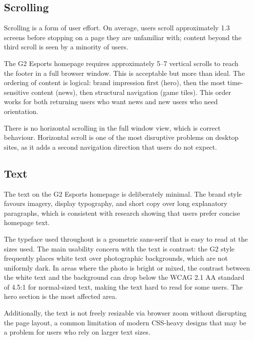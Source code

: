 \documentclass[12pt, a4paper]{article}
\begin{document}
\subsection{Scrolling}

Scrolling is a form of user effort. On average, users scroll approximately 1.3 screens before stopping on a page they are unfamiliar with; content beyond the third scroll is seen by a minority of users.

The G2 Esports homepage requires approximately 5--7 vertical scrolls to reach the footer in a full browser window. This is acceptable but more than ideal. The ordering of content is logical: brand impression first (hero), then the most time-sensitive content (news), then structural navigation (game tiles). This order works for both returning users who want news and new users who need orientation.

There is no horizontal scrolling in the full window view, which is correct behaviour. Horizontal scroll is one of the most disruptive problems on desktop sites, as it adds a second navigation direction that users do not expect.

\subsection{Text}

The text on the G2 Esports homepage is deliberately minimal. The brand style favours imagery, display typography, and short copy over long explanatory paragraphs, which is consistent with research showing that users prefer concise homepage text.

The typeface used throughout is a geometric sans-serif that is easy to read at the sizes used. The main usability concern with the text is contrast: the G2 style frequently places white text over photographic backgrounds, which are not uniformly dark. In areas where the photo is bright or mixed, the contrast between the white text and the background can drop below the WCAG 2.1 AA standard of 4.5:1 for normal-sized text, making the text hard to read for some users. The hero section is the most affected area.

Additionally, the text is not freely resizable via browser zoom without disrupting the page layout, a common limitation of modern CSS-heavy designs that may be a problem for users who rely on larger text sizes.
\end{document}

